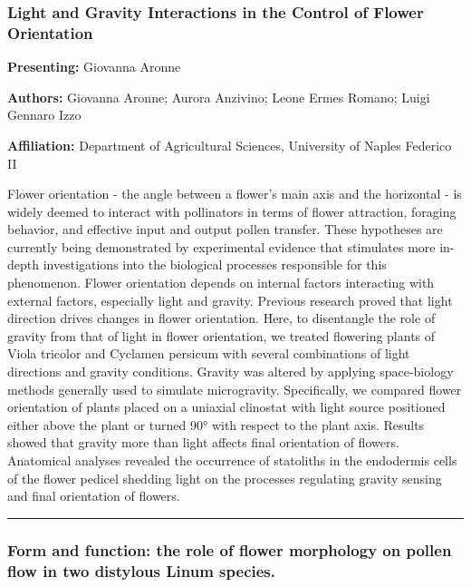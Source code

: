 \documentclass[
  letterpaper,
  DIV=11,
  numbers=noendperiod]{scrartcl}
\begin{document}
\subsubsection{Light and Gravity Interactions in the Control of Flower
Orientation}\label{light-and-gravity-interactions-in-the-control-of-flower-orientation}

\textbf{Presenting:} Giovanna Aronne

\textbf{Authors:} Giovanna Aronne; Aurora Anzivino; Leone Ermes Romano;
Luigi Gennaro Izzo

\textbf{Affiliation:} Department of Agricultural Sciences, University of
Naples Federico II

Flower orientation - the angle between a flower's main axis and the
horizontal - is widely deemed to interact with pollinators in terms of
flower attraction, foraging behavior, and effective input and output
pollen transfer. These hypotheses are currently being demonstrated by
experimental evidence that stimulates more in-depth investigations into
the biological processes responsible for this phenomenon. Flower
orientation depends on internal factors interacting with external
factors, especially light and gravity. Previous research proved that
light direction drives changes in flower orientation. Here, to
disentangle the role of gravity from that of light in flower
orientation, we treated flowering plants of Viola tricolor and Cyclamen
persicum with several combinations of light directions and gravity
conditions. Gravity was altered by applying space-biology methods
generally used to simulate microgravity. Specifically, we compared
flower orientation of plants placed on a uniaxial clinostat with light
source positioned either above the plant or turned 90° with respect to
the plant axis. Results showed that gravity more than light affects
final orientation of flowers. Anatomical analyses revealed the
occurrence of statoliths in the endodermis cells of the flower pedicel
shedding light on the processes regulating gravity sensing and final
orientation of flowers.

\begin{center}\rule{0.5\linewidth}{0.5pt}\end{center}

\subsubsection{Form and function: the role of flower morphology on
pollen flow in two distylous Linum
species.}\label{form-and-function-the-role-of-flower-morphology-on-pollen-flow-in-two-distylous-linum-species.}
\end{document}
